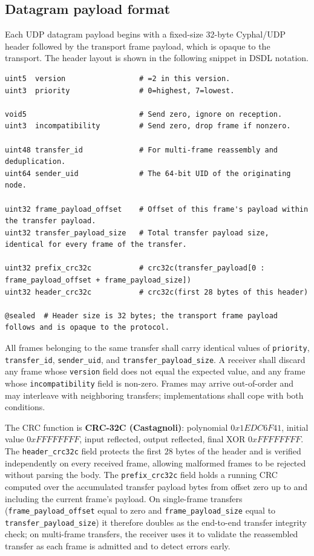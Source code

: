 \subsection{Datagram payload format}\label{sec:transport_udp_payload}

Each UDP datagram payload begins with a fixed-size 32-byte Cyphal/UDP header followed by the transport
frame payload, which is opaque to the transport. The header layout is shown in the following snippet in DSDL notation.

\begin{samepage}
\begin{verbatim}
uint5  version                 # =2 in this version.
uint3  priority                # 0=highest, 7=lowest.

void5                          # Send zero, ignore on reception.
uint3  incompatibility         # Send zero, drop frame if nonzero.

uint48 transfer_id             # For multi-frame reassembly and deduplication.
uint64 sender_uid              # The 64-bit UID of the originating node.

uint32 frame_payload_offset    # Offset of this frame's payload within the transfer payload.
uint32 transfer_payload_size   # Total transfer payload size, identical for every frame of the transfer.

uint32 prefix_crc32c           # crc32c(transfer_payload[0 : frame_payload_offset + frame_payload_size])
uint32 header_crc32c           # crc32c(first 28 bytes of this header)

@sealed  # Header size is 32 bytes; the transport frame payload follows and is opaque to the protocol.
\end{verbatim}
\end{samepage}

All frames belonging to the same transfer shall carry identical values of \texttt{priority},
\texttt{transfer\_id}, \texttt{sender\_uid}, and \texttt{transfer\_payload\_size}.
A receiver shall discard any frame whose \texttt{version} field does not equal the expected value,
and any frame whose \texttt{incompatibility} field is non-zero.
Frames may arrive out-of-order and may interleave with neighboring transfers;
implementations shall cope with both conditions.

The CRC function is \textbf{CRC-32C (Castagnoli)}: polynomial $0x1EDC6F41$, initial value $0xFFFFFFFF$,
input reflected, output reflected, final XOR $0xFFFFFFFF$.
The \texttt{header\_crc32c} field protects the first $28$ bytes of the header and is verified
independently on every received frame, allowing malformed frames to be rejected without parsing the body.
The \texttt{prefix\_crc32c} field holds a running CRC computed over the accumulated transfer payload bytes
from offset zero up to and including the current frame's payload. On single-frame transfers
(\texttt{frame\_payload\_offset} equal to zero and \texttt{frame\_payload\_size} equal to
\texttt{transfer\_payload\_size}) it therefore doubles as the end-to-end transfer integrity check;
on multi-frame transfers, the receiver uses it to validate the reassembled transfer as each frame is
admitted and to detect errors early.

